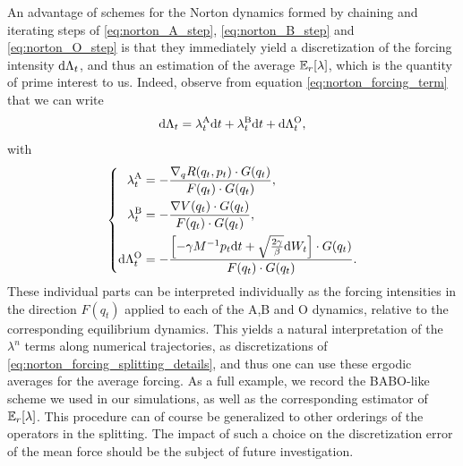 An advantage of schemes for the Norton dynamics formed by chaining and iterating steps of \eqref{eq:norton_A_step}, \eqref{eq:norton_B_step} and \eqref{eq:norton_O_step} 
is that they immediately yield a discretization of the forcing intensity $\mathrm{d}\Lambda_t$, and thus an estimation of the average $\mathbb{E}_r[\lambda]$, which is the quantity of prime interest to us.
Indeed, observe from equation \eqref{eq:norton_forcing_term} that we can write
\begin{equation}
    \label{eq:norton_forcing_splitting}
    \mathrm{d} \Lambda_t = \lambda^{\mathrm{A}}_t \mathrm{d} t + \lambda^{\mathrm{B}}_t\mathrm{d} t + \mathrm{d} \Lambda_t^{\mathrm{O}},
\end{equation}
with 
\begin{equation}
    \label{eq:norton_forcing_splitting_details}
    \left\{
    \begin{aligned}
        \lambda^{\mathrm{A}}_t &= -\frac{\nabla_q R(q_t,p_t)\cdot G(q_t)}{F(q_t)\cdot G(q_t)},\\
        \lambda^{\mathrm{B}}_t &= -\frac{\nabla V(q_t)\cdot G(q_t)}{F(q_t)\cdot G(q_t)},\\
        \mathrm{d} \Lambda_t^{\mathrm{O}} &= -\frac{\left[-\gamma M^{-1}p_t\mathrm{d} t +\sqrt{\frac{2\gamma}\beta}\mathrm{d} W_t \right]\cdot G(q_t)}{F(q_t)\cdot G(q_t)}.
    \end{aligned}
    \right.
\end{equation}
These individual parts can be interpreted individually as the forcing intensities in the direction $F(q_t)$ applied to each of the A,B and O dynamics, relative to the corresponding equilibrium dynamics.
This yields a natural interpretation of the $\lambda^n$ terms along numerical trajectories, as discretizations of \eqref{eq:norton_forcing_splitting_details}, 
and thus one can use these ergodic averages for the average forcing. As a full example, we record the BABO-like scheme we used in our simulations, as well as the corresponding estimator of $\mathbb{E}_r[\lambda]$.
This procedure can of course be generalized to other orderings of the operators in the splitting. The impact of such a choice on the discretization error of the mean force should be the subject of future investigation.

